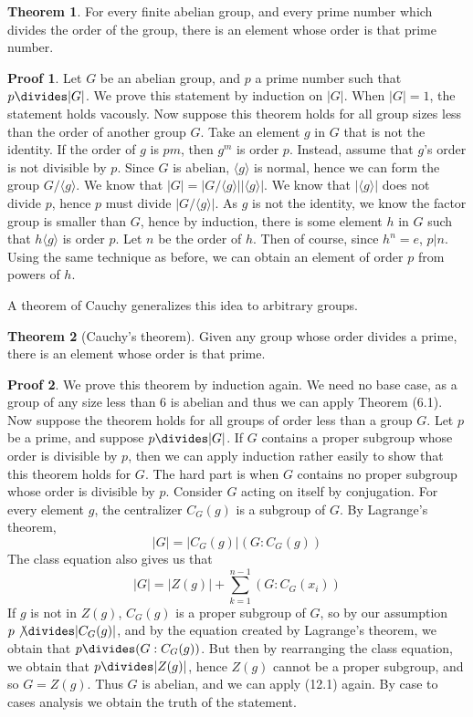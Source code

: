\documentclass[12pt]{amsbook}
\theoremstyle{definition}
\newtheorem{theorem}{Theorem}[chapter]
\newtheorem*{prf}{Proof}
\newcommand{\gen}[1]{\langle #1 \rangle} %
\begin{document}
\begin{theorem}
    For every finite abelian group, and every prime number which divides the order of the group, there is an element whose order is that prime number.
\end{theorem}
\begin{prf}
    Let $G$ be an abelian group, and $p$ a prime number such that $p \divides |G|$. We prove this statement by induction on $|G|$. When $|G| = 1$, the statement holds vacously. Now suppose this theorem holds for all group sizes less than the order of another group $G$. Take an element $g$ in $G$ that is not the identity. If the order of $g$ is $pm$, then $g^m$ is order $p$. Instead, assume that $g$'s order is not divisible by $p$. Since $G$ is abelian, $\gen{g}$ is normal, hence we can form the group $G/\gen{g}$. We know that $|G| = |G/\gen{g}| |\gen{g}|$. We know that $|\gen{g}|$ does not divide $p$, hence $p$ must divide $|G/\gen{g}|$. As $g$ is not the identity, we know the factor group is smaller than $G$, hence by induction, there is some element $h$ in $G$ such that $h \gen{g}$ is order $p$. Let $n$ be the order of $h$. Then of course, since $h^n = e$, $p|n$. Using the same technique as before, we can obtain an element of order $p$ from powers of $h$.
\end{prf}

A theorem of Cauchy generalizes this idea to arbitrary groups.

\begin{theorem}[Cauchy's theorem] 
    Given any group whose order divides a prime, there is an element whose order is that prime.
\end{theorem}
\begin{prf}
    We prove this theorem by induction again. We need no base case, as a group of any size less than 6 is abelian and thus we can apply Theorem (6.1). Now suppose the theorem holds for all groups of order less than a group $G$. Let $p$ be a prime, and suppose $p \divides |G|$. If $G$ contains a proper subgroup whose order is divisible by $p$, then we can apply induction rather easily to show that this theorem holds for $G$. The hard part is when $G$ contains no proper subgroup whose order is divisible by $p$. Consider $G$ acting on itself by conjugation. For every element $g$, the centralizer $C_G(g)$ is a subgroup of $G$. By Lagrange's theorem,
    \[ |G| = |C_G(g)|(G:C_G(g)) \]
    The class equation also gives us that
    \[ |G| = |Z(g)| + \sum_{k = 1}^{n-1} (G:C_G(x_i)) \]
    If $g$ is not in $Z(g)$, $C_G(g)$ is a proper subgroup of $G$, so by our assumption $p \not \divides |C_G(g)|$, and by the equation created by Lagrange's theorem, we obtain that $p \divides (G:C_G(g))$. But then by rearranging the class equation, we obtain that $p \divides |Z(g)|$, hence $Z(g)$ cannot be a proper subgroup, and so $G = Z(g)$. Thus $G$ is abelian, and we can apply (12.1) again. By case to cases analysis we obtain the truth of the statement.
\end{prf}
\end{document}
